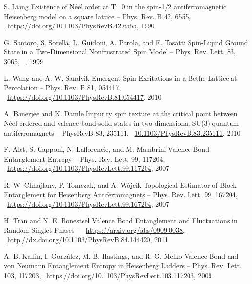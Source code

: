 \documentclass[11pt]{article}
\begin{document}
\begin{thebibliography}{3}
S. Liang Existence of Néel order at T=0 in the spin-1/2 antiferromagnetic Heisenberg model on a square lattice -- Phys. Rev. B 42, 6555,  ~\url{https://doi.org/10.1103/PhysRevB.42.6555}, 1990

G. Santoro, S. Sorella, L. Guidoni, A. Parola, and E. Tosatti Spin-Liquid Ground State in a Two-Dimensional Nonfrustrated Spin Model -- Phys. Rev. Lett. 83, 3065,  ~\url{}, 1999

L. Wang and A. W. Sandvik Emergent Spin Excitations in a Bethe Lattice at Percolation -- Phys. Rev. B 81, 054417,  ~\url{https://doi.org/10.1103/PhysRevB.81.054417}, 2010

A. Banerjee and K. Damle Impurity spin texture at the critical point between Néel-ordered and valence-bond-solid states in two-dimensional SU(3) quantum antiferromagnets -- PhysRevB 83, 235111,  ~\url{10.1103/PhysRevB.83.235111}, 2010

F. Alet, S. Capponi, N. Laflorencie, and M. Mambrini  Valence Bond Entanglement Entropy -- Phys. Rev. Lett. 99, 117204,  ~\url{https://doi.org/10.1103/PhysRevLett.99.117204}, 2007

R. W. Chhajlany, P. Tomczak, and A. Wójcik Topological Estimator of Block Entanglement for Heisenberg Antiferromagnets -- Phys. Rev. Lett. 99, 167204,  ~\url{https://doi.org/10.1103/PhysRevLett.99.167204}, 2007

H. Tran and N. E. Bonesteel Valence Bond Entanglement and Fluctuations in Random Singlet Phases -- ~\url{https://arxiv.org/abs/0909.0038},  ~\url{http://dx.doi.org/10.1103/PhysRevB.84.144420}, 2011

A. B. Kallin, I. González, M. B. Hastings, and R. G. Melko Valence Bond and von Neumann Entanglement Entropy in Heisenberg Ladders -- Phys. Rev. Lett. 103, 117203,  ~\url{https://doi.org/10.1103/PhysRevLett.103.117203}, 2009

\end{thebibliography}
\end{document}
